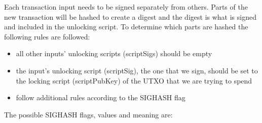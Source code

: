 Each transaction input needs to be signed separately from others. Parts of the new transaction will be hashed to create a digest and the digest is what is signed and included in the unlocking script. To determine which parts are hashed the following rules are followed:

\begin{itemize}
\item all other inputs’ unlocking scripts (scriptSigs) should be empty
\item the input’s unlocking script (scriptSig), the one that we sign, should be set to the locking script (scriptPubKey) of the UTXO that we are trying to spend
\item follow additional rules according to the SIGHASH flag
\end{itemize}

The possible SIGHASH flags, values and meaning are:

